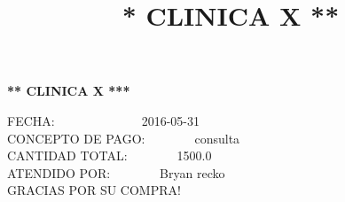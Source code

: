 \documentclass[10pt,a4paper]{letter}
\title{\bf ** CLINICA X **}
\begin{document}
\begin{center}
{\scshape\LARGE \bf *** CLINICA X ***\par}

\end{center}

FECHA:\ \ \ \ \ \ \ \ \ \ \ \ \ \ 2016-05-31 \\
CONCEPTO DE PAGO:\ \  \ \ \ \ \ \ consulta \\
CANTIDAD TOTAL:\ \ \ \ \ \ \ \ 1500.0 \\
ATENDIDO POR:\ \ \ \ \ \ \ \ Bryan recko \\
GRACIAS POR SU COMPRA! \\ \\

 
\end{document}
